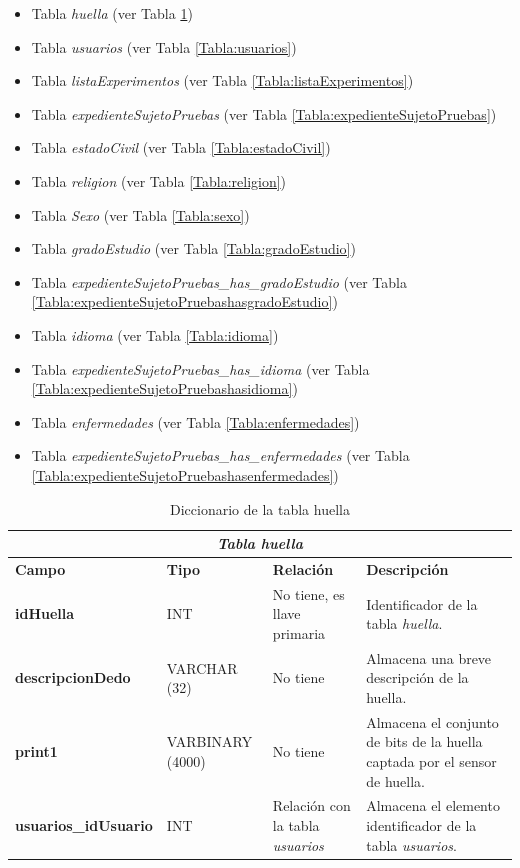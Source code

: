 \begin{itemize}
\item Tabla \textit{huella} (ver Tabla \ref{Tabla:huella})
\item Tabla \textit{usuarios} (ver Tabla \ref{Tabla:usuarios})
\item Tabla \textit{listaExperimentos} (ver Tabla \ref{Tabla:listaExperimentos})
\item Tabla \textit{expedienteSujetoPruebas} (ver Tabla \ref{Tabla:expedienteSujetoPruebas})
\item Tabla \textit{estadoCivil} (ver Tabla \ref{Tabla:estadoCivil})
\item Tabla \textit{religion} (ver Tabla \ref{Tabla:religion})
\item Tabla \textit{Sexo} (ver Tabla \ref{Tabla:sexo})
\item Tabla \textit{gradoEstudio} (ver Tabla \ref{Tabla:gradoEstudio})
\item Tabla \textit{expedienteSujetoPruebas\_has\_gradoEstudio} (ver Tabla \ref{Tabla:expedienteSujetoPruebashasgradoEstudio})
\item Tabla \textit{idioma} (ver Tabla \ref{Tabla:idioma})
\item Tabla \textit{expedienteSujetoPruebas\_has\_idioma} (ver Tabla \ref{Tabla:expedienteSujetoPruebashasidioma})
\item Tabla \textit{enfermedades} (ver Tabla \ref{Tabla:enfermedades})
\item Tabla \textit{expedienteSujetoPruebas\_has\_enfermedades} (ver Tabla \ref{Tabla:expedienteSujetoPruebashasenfermedades})
\end{itemize}

\begin{table}[H]
\begin{center}
\begin{tabular}{||p{4cm}|p{}|p{}|p{5cm}||}
\hline \multicolumn{4}{||c||}{\textit{\textbf{Tabla huella}}}\\ \hline \cellcolor{lightgray}\textbf{Campo} & \cellcolor{lightgray}\textbf{Tipo} &\cellcolor{lightgray}\textbf{Relación} & \cellcolor{lightgray}\textbf{Descripción} \\ \hline 
\textbf{idHuella} & {INT} & {No tiene, es llave primaria} & {Identificador de la tabla \textit{huella}.} \\ \hline \textbf{descripcionDedo} & {VARCHAR (32)} & {No tiene} & {Almacena una breve descripción de la huella.} \\ \hline
\textbf{print1} & {VARBINARY (4000)} & {No tiene} & {Almacena el conjunto de bits de la huella captada por el sensor de huella.} \\ \hline
\textbf{usuarios\_idUsuario} & {INT} & {Relación con la tabla \textit{usuarios}} & {Almacena el elemento identificador de la tabla \textit{usuarios}.} \\ \hline
\end{tabular}
\caption{Diccionario de la tabla huella}
\label{Tabla:huella}
\end{center}
\end{table}

